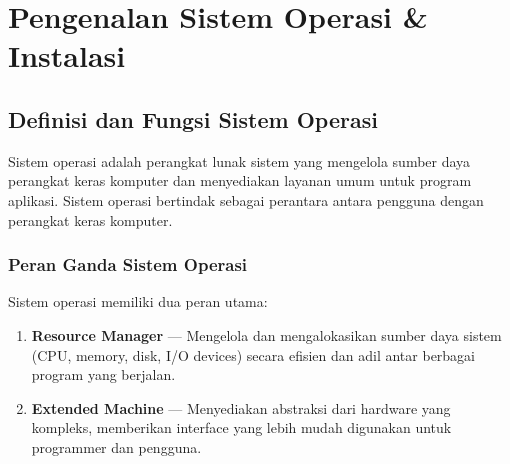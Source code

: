 
\chapter{Pengenalan Sistem Operasi \& Instalasi}
\label{ch:introduction}

\begin{abstract}
Bab ini memperkenalkan konsep fundamental sistem operasi, arsitektur kernel, perbandingan sistem operasi modern, serta proses instalasi dan konfigurasi sistem operasi dengan fokus praktis menggunakan Linux.
\end{abstract}


\section{Definisi dan Fungsi Sistem Operasi}
\label{sec:os-basics}

Sistem operasi adalah perangkat lunak sistem yang mengelola sumber daya perangkat keras komputer dan menyediakan layanan umum untuk program aplikasi. Sistem operasi bertindak sebagai perantara antara pengguna dengan perangkat keras komputer.

\subsection{Peran Ganda Sistem Operasi}

Sistem operasi memiliki dua peran utama:

\begin{enumerate}
    \item \textbf{Resource Manager} --- Mengelola dan mengalokasikan sumber daya sistem (CPU, memory, disk, I/O devices) secara efisien dan adil antar berbagai program yang berjalan.

    \item \textbf{Extended Machine} --- Menyediakan abstraksi dari hardware yang kompleks, memberikan interface yang lebih mudah digunakan untuk programmer dan pengguna.
\end{enumerate}

